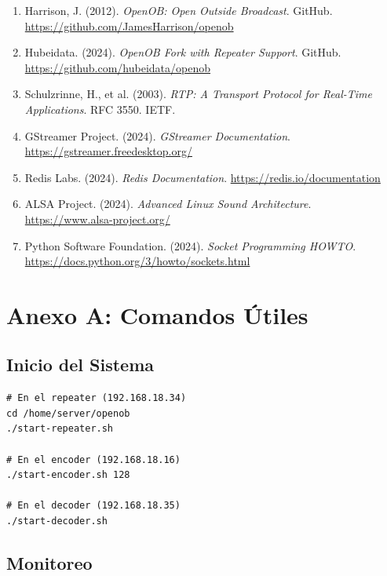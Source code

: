 \documentclass[12pt,a4paper]{article}
\begin{document}
\begin{enumerate}[itemsep=0.5em]
    \item Harrison, J. (2012). \textit{OpenOB: Open Outside Broadcast}. GitHub. \url{https://github.com/JamesHarrison/openob}
    
    \item Hubeidata. (2024). \textit{OpenOB Fork with Repeater Support}. GitHub. \url{https://github.com/hubeidata/openob}
    
    \item Schulzrinne, H., et al. (2003). \textit{RTP: A Transport Protocol for Real-Time Applications}. RFC 3550. IETF.
    
    \item GStreamer Project. (2024). \textit{GStreamer Documentation}. \url{https://gstreamer.freedesktop.org/}
    
    \item Redis Labs. (2024). \textit{Redis Documentation}. \url{https://redis.io/documentation}
    
    \item ALSA Project. (2024). \textit{Advanced Linux Sound Architecture}. \url{https://www.alsa-project.org/}
    
    \item Python Software Foundation. (2024). \textit{Socket Programming HOWTO}. \url{https://docs.python.org/3/howto/sockets.html}
\end{enumerate}

\newpage

\appendix

\section{Anexo A: Comandos Útiles}

\subsection{Inicio del Sistema}

\begin{lstlisting}[style=bashstyle]
# En el repeater (192.168.18.34)
cd /home/server/openob
./start-repeater.sh

# En el encoder (192.168.18.16)
./start-encoder.sh 128

# En el decoder (192.168.18.35)
./start-decoder.sh
\end{lstlisting}

\subsection{Monitoreo}
\end{document}
